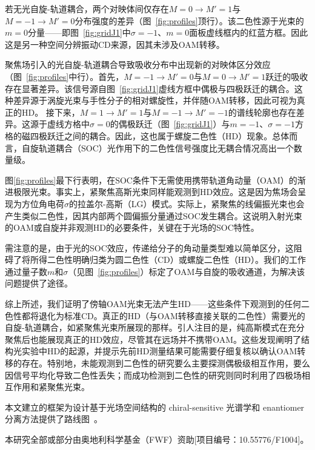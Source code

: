 \documentclass[reprint,aps,prl,twocolumn,superscriptaddress,groupedaddress]{revtex4-2}
\begin{document}
\begin{CJK*}{UTF8}{gbsn}
若无光自旋-轨道耦合，两个对映体间仅存在$M=0\to M'=1$与$M=-1\to M'=0$分布强度的差异（图~\ref{fig:profiles}顶行）。该二色性源于光束的$m=0$分量——即图~\ref{fig:gridJ1}中$\sigma=-1$、$m=0$面板虚线框内的红蓝方框。因此这是另一种空间分辨振动CD来源，因其未涉及OAM转移。

聚焦场引入的光自旋-轨道耦合导致吸收分布中出现新的对映体区分效应（图~\ref{fig:profiles}中行）。首先，$M=-1\to M'=0$与$M=0\to M'=1$跃迁的吸收存在显著差异。该信号源自图~\ref{fig:gridJ1}虚线方框中偶极与四极跃迁的耦合。这种差异源于涡旋光束与手性分子的相对螺旋性，并伴随OAM转移，因此可视为真正的HD。
接下来，$M=1\to M'=1$与$M=-1\to M'=-1$的谱线轮廓也存在差异。这源于虚线方格中$\sigma=0$的偶极跃迁（图~\ref{fig:gridJ1}）与$m=-1$、$\sigma=-1$方格的磁四极跃迁之间的耦合。因此，这也属于螺旋二色性（HD）现象。总体而言，自旋轨道耦合（SOC）光作用下的二色性信号强度比无耦合情况高出一个数量级。

图\ref{fig:profiles}最下行表明，在SOC条件下无需使用携带轨道角动量（OAM）的渐进极限光束。事实上，紧聚焦高斯光束同样能观测到HD效应。这是因为焦场会呈现为方位角电荷$\sigma$的拉盖尔-高斯（LG）模式。实际上，紧聚焦的线偏振光束也会产生类似二色性，因其内部两个圆偏振分量通过SOC发生耦合。这说明入射光束的OAM或自旋并非观测HD的必要条件，关键在于光场的SOC特性。

需注意的是，由于光的SOC效应，传递给分子的角动量类型难以简单区分，这阻碍了将所得二色性明确归类为圆二色性（CD）或螺旋二色性（HD）。我们的工作通过量子数$m$和$\sigma$（见图~\ref{fig:profiles}）标定了OAM与自旋的吸收通道，为解决该问题提供了途径。

综上所述，我们证明了傍轴OAM光束无法产生HD——这些条件下观测到的任何二色性都将退化为标准CD。真正的HD（与OAM转移直接关联的二色性）需要光的自旋-轨道耦合，如紧聚焦光束所展现的那样。引人注目的是，纯高斯模式在充分聚焦后也能展现真正的HD效应，尽管其在远场并不携带OAM。这些发现阐明了结构光实验中HD的起源，并提示先前HD测量结果可能需要仔细复核以确认OAM转移的存在。特别地，未能观测到二色性的研究要么主要探测偶极级相互作用\cite{Araoka2005}，要么因信号平均化导致二色性丢失\cite{Loeffler2011}；而成功检测到二色性的研究则同时利用了四极场相互作用和紧聚焦光束\cite{Rusak2019,Rouxel2022,Begin2023,Jain2023}。

本文建立的框架为设计基于光场空间结构的 chiral-sensitive 光谱学和 enantiomer 分离方法提供了路线图~\cite{Leibscher2022}。\\
\begin{acknowledgments}
本研究全部或部分由奥地利科学基金（FWF）资助[项目编号：10.55776/F1004]。
\end{acknowledgments}

\end{CJK*}
\end{document}
